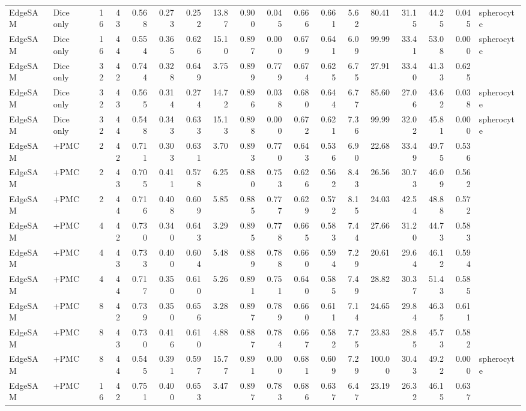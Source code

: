 \documentclass[10pt]{article}
\begin{document}
\begin{landscape}
{\begin{longtable}{l l r r r r r r r r r r r r r r r l}
EdgeSAM & Dice only & 16 & 43 & 0.568 & 0.273 & 0.252 & 13.87 & 0.900 & 0.045 & 0.666 & 0.661 & 5.62 & 80.41 & 31.15 & 44.25 & 0.045 & spherocyte \\
EdgeSAM & Dice only & 16 & 44 & 0.554 & 0.365 & 0.626 & 15.10 & 0.897 & 0.000 & 0.679 & 0.641 & 6.09 & 99.99 & 33.41 & 53.08 & 0.000 & spherocyte \\
EdgeSAM & Dice only & 32 & 42 & 0.744 & 0.328 & 0.649 & 3.75 & 0.899 & 0.779 & 0.674 & 0.625 & 6.75 & 27.91 & 33.40 & 41.33 & 0.625 &  \\
EdgeSAM & Dice only & 32 & 43 & 0.565 & 0.314 & 0.274 & 14.72 & 0.896 & 0.038 & 0.680 & 0.644 & 6.77 & 85.60 & 27.06 & 43.62 & 0.038 & spherocyte \\
EdgeSAM & Dice only & 32 & 44 & 0.548 & 0.343 & 0.633 & 15.13 & 0.898 & 0.000 & 0.672 & 0.621 & 7.36 & 99.99 & 32.02 & 45.81 & 0.000 & spherocyte \\
EdgeSAM & +PMC & 2 & 42 & 0.711 & 0.303 & 0.631 & 3.70 & 0.893 & 0.770 & 0.643 & 0.536 & 6.90 & 22.68 & 33.49 & 49.75 & 0.536 &  \\
EdgeSAM & +PMC & 2 & 43 & 0.705 & 0.411 & 0.578 & 6.25 & 0.880 & 0.753 & 0.626 & 0.562 & 8.43 & 26.56 & 30.73 & 46.09 & 0.562 &  \\
EdgeSAM & +PMC & 2 & 44 & 0.716 & 0.408 & 0.609 & 5.85 & 0.885 & 0.777 & 0.629 & 0.572 & 8.15 & 24.03 & 42.54 & 48.88 & 0.572 &  \\
EdgeSAM & +PMC & 4 & 42 & 0.730 & 0.340 & 0.643 & 3.29 & 0.895 & 0.778 & 0.665 & 0.583 & 7.44 & 27.66 & 31.20 & 44.73 & 0.583 &  \\
EdgeSAM & +PMC & 4 & 43 & 0.733 & 0.400 & 0.604 & 5.48 & 0.889 & 0.788 & 0.660 & 0.594 & 7.29 & 20.61 & 29.64 & 46.12 & 0.594 &  \\
EdgeSAM & +PMC & 4 & 44 & 0.717 & 0.350 & 0.610 & 5.26 & 0.891 & 0.751 & 0.640 & 0.585 & 7.49 & 28.82 & 30.37 & 51.43 & 0.585 &  \\
EdgeSAM & +PMC & 8 & 42 & 0.739 & 0.350 & 0.656 & 3.28 & 0.897 & 0.789 & 0.660 & 0.611 & 7.14 & 24.65 & 29.84 & 46.35 & 0.611 &  \\
EdgeSAM & +PMC & 8 & 43 & 0.730 & 0.416 & 0.610 & 4.88 & 0.887 & 0.784 & 0.667 & 0.582 & 7.75 & 23.83 & 28.85 & 45.73 & 0.582 &  \\
EdgeSAM & +PMC & 8 & 44 & 0.545 & 0.391 & 0.597 & 15.77 & 0.891 & 0.000 & 0.681 & 0.609 & 7.29 & 100.00 & 30.43 & 49.22 & 0.000 & spherocyte \\
EdgeSAM & +PMC & 16 & 42 & 0.751 & 0.400 & 0.653 & 3.47 & 0.897 & 0.783 & 0.686 & 0.637 & 6.47 & 23.19 & 26.32 & 46.15 & 0.637 &  \\

\end{longtable}}
\end{landscape}
\end{document}
